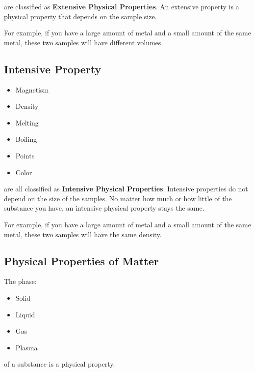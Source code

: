 are classified as \textbf{Extensive Physical Properties}. An extensive property
is a physical property that depends on the sample size.

\begin{example}
  For example, if you have a large amount of metal and a small amount of the same
  metal, these two samples will have different volumes.
\end{example}


\subsection*{Intensive Property}
\label{sub_sec:intensive_property}

\begin{itemize}
  \item Magnetism
  \item Density
  \item Melting
  \item Boiling
  \item Points
  \item Color
\end{itemize}

are all classified as \textbf{Intensive Physical Properties}. Intensive
properties do not depend on the size of the samples. No matter how much or how
little of the substance you have, an intensive physical property stays the
same.

\begin{example}
  For example, if you have a large amount of metal and a small amount of
  the same metal, these two samples will have the same density.
\end{example}


\subsection*{Physical Properties of Matter}
\label{sub_sec:physical_properties_of_matter}

\begin{definition}
  The phase:

  \begin{itemize}
    \item Solid
    \item Liquid
    \item Gas
    \item Plasma
  \end{itemize}

  of a substance is a physical property.
\end{definition}

